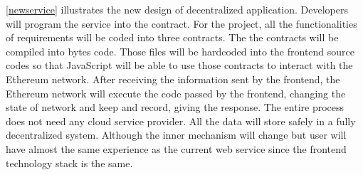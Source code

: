\documentclass [11pt]{report}
\begin{document}
\ref{newservice} illustrates the new design of decentralized application. Developers will program the service into the contract. 
For the project, all the functionalities of requirements will be coded into three contracts. The the contracts will be compiled into bytes code. 
Those files will be hardcoded into the frontend source codes so that JavaScript will be able to use those contracts to interact with the Ethereum network.
After receiving the information sent by the frontend, the Ethereum network will execute the code passed by the frontend, 
changing the state of network and keep and record, 
giving the response. The entire process does not need any cloud service provider. 
All the data will store safely in a fully decentralized system. 
Although the inner mechanism will change 
but user will have almost the same experience as the current web service 
since the frontend technology stack is the same.
\end{document}
